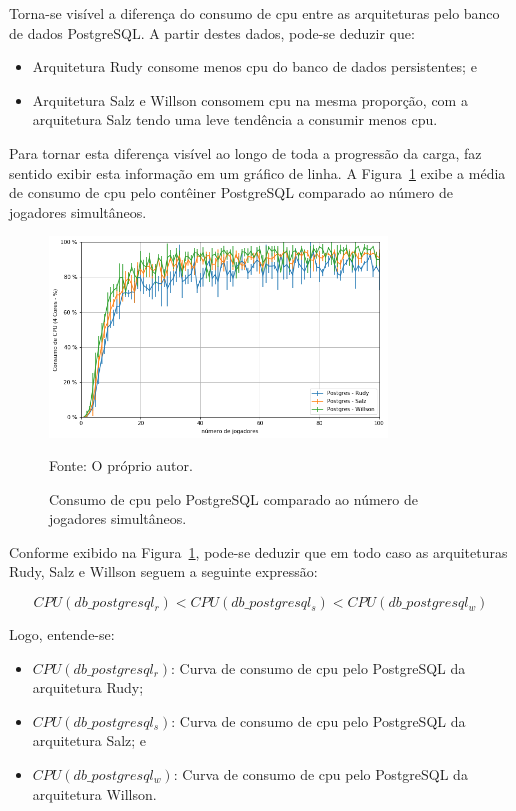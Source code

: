 Torna-se visível a diferença do consumo de \ac{cpu} entre as arquiteturas pelo banco de dados PostgreSQL.
%
A partir destes dados, pode-se deduzir que:

\begin{itemize}
 \item Arquitetura Rudy consome menos \ac{cpu} do banco de dados persistentes; e
 \item Arquitetura Salz e Willson consomem \ac{cpu} na mesma proporção, com a arquitetura Salz tendo uma leve tendência a consumir menos \ac{cpu}.
\end{itemize}

Para tornar esta diferença visível ao longo de toda a progressão da carga, faz sentido exibir esta informação em um gráfico de linha.
%
A Figura~\ref{fig:cpu_db_media_por_jogador} exibe a média de consumo de \ac{cpu} pelo contêiner PostgreSQL comparado ao número de jogadores simultâneos.

\begin{figure}[htb!]
  \caption{Consumo de \ac{cpu} pelo PostgreSQL comparado ao número de jogadores simultâneos.}
  \label{fig:cpu_db_media_por_jogador}
  \includegraphics[width=0.8\textwidth]{figuras/analise/cpu_db_media_por_jogador.png}
  \centering

  Fonte: O próprio autor.
\end{figure}

Conforme exibido na Figura~\ref{fig:cpu_db_media_por_jogador}, pode-se deduzir que em todo caso as arquiteturas Rudy, Salz e Willson seguem a seguinte expressão:

$$
    CPU(db\_postgresql_{r}) < CPU(db\_postgresql_{s}) < CPU(db\_postgresql_{w})
$$

Logo, entende-se:

\begin{itemize}
\item $CPU(db\_postgresql_{r})$: Curva de consumo de \ac{cpu} pelo PostgreSQL da arquitetura Rudy;
\item $CPU(db\_postgresql_{s})$: Curva de consumo de \ac{cpu} pelo PostgreSQL da arquitetura Salz; e
\item $CPU(db\_postgresql_{w})$: Curva de consumo de \ac{cpu} pelo PostgreSQL da arquitetura Willson.
\end{itemize}

